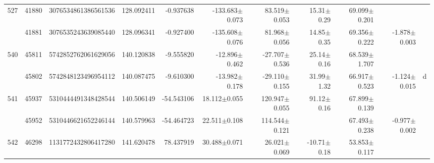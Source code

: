 \documentclass{ws-ijmpd}
\begin{document}
\begin{landscape}
\begin{longtable}{rrrrrrrrrrl}
 \hline 527 &   41880 &      3076534861386561536 &                   128.092411 &                    -0.937638 &               -133.683$\pm$0.073 &                 83.519$\pm$0.053 &          15.31$\pm$  0.29 &        69.099$\pm$0.201 &                                           &                                                    \\
            &   41881 &      3076535243639085440 &                   128.096341 &                    -0.927400 &               -135.608$\pm$0.076 &                 81.968$\pm$0.056 &          14.85$\pm$  0.35 &        69.356$\pm$0.222 &                          -1.878$\pm$0.003 &                                                    \\
 \hline 540 &   45811 &      5742852762061629056 &                   140.120838 &                    -9.555820 &                -12.896$\pm$0.462 &                -27.707$\pm$0.536 &          25.14$\pm$  0.16 &        68.539$\pm$1.707 &                                           &                                                    \\
            &   45802 &      5742848123496954112 &                   140.087475 &                    -9.610300 &                -13.982$\pm$0.178 &                -29.110$\pm$0.155 &          31.99$\pm$  1.32 &        66.917$\pm$0.523 &                          -1.124$\pm$0.015 &                                                  d \\
 \hline 541 &   45937 &      5310444491348428544 &                   140.506149 &                   -54.543106 &                 18.112$\pm$0.055 &                120.947$\pm$0.055 &          91.12$\pm$  0.16 &        67.899$\pm$0.139 &                                           &                                                    \\
            &   45952 &      5310446621652246144 &                   140.579963 &                   -54.464723 &                 22.511$\pm$0.108 &                114.544$\pm$0.121 &                           &        67.493$\pm$0.238 &                          -0.977$\pm$0.002 &                                                    \\
 \hline 542 &   46298 &      1131772432806417280 &                   141.620478 &                    78.437919 &                 30.488$\pm$0.071 &                 26.021$\pm$0.069 &         -10.71$\pm$  0.18 &        53.853$\pm$0.117 &                                           &                                                    \\

\end{longtable}
\end{landscape}
\end{document}
